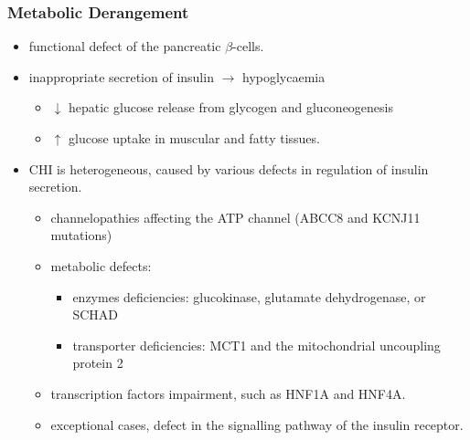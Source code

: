 \documentclass{scrartcl}
\begin{document}
\subsubsection{Metabolic Derangement}
\label{sec:orge19b8d9}
\begin{itemize}
\item functional defect of the pancreatic \(\beta\)-cells.
\item inappropriate secretion of insulin \(\to\) hypoglycaemia
\begin{itemize}
\item \(\downarrow\) hepatic glucose release from glycogen and gluconeogenesis
\item \(\uparrow\) glucose uptake in muscular and fatty tissues.
\end{itemize}
\item CHI is heterogeneous, caused by various defects in regulation of insulin secretion.
\begin{itemize}
\item channelopathies affecting the ATP channel (ABCC8 and KCNJ11 mutations)
\item metabolic defects:
\begin{itemize}
\item enzymes deficiencies: glucokinase, glutamate dehydrogenase, or SCHAD
\item transporter deficiencies: MCT1 and the mitochondrial uncoupling protein 2
\end{itemize}
\item transcription factors impairment, such as HNF1A and HNF4A.
\item exceptional cases, defect in the signalling pathway of the insulin
receptor.
\end{itemize}
\end{itemize}
\end{document}
